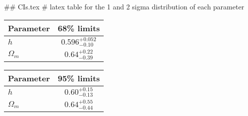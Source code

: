 ## CIs.tex
# latex table for the 1 and 2 sigma distribution of each parameter

\begin{tabular} { l  c}
 Parameter &  68\% limits\\
\hline
{\boldmath$h              $} & $0.596^{+0.052}_{-0.10}    $\\
{\boldmath$\Omega_m       $} & $0.64^{+0.22}_{-0.39}      $\\
\hline
\end{tabular}

\begin{tabular} { l  c}
 Parameter &  95\% limits\\
\hline
{\boldmath$h              $} & $0.60^{+0.15}_{-0.13}      $\\
{\boldmath$\Omega_m       $} & $0.64^{+0.55}_{-0.44}      $\\
\hline
\end{tabular}
